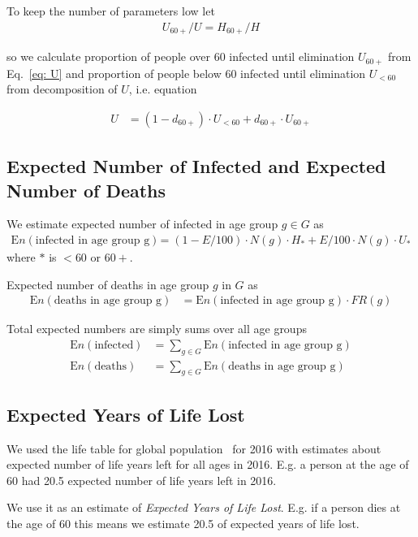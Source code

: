 \documentclass[12pt]{article}
\begin{document}
To keep the number of parameters low let
\begin{align}\label{eq: U}
U_{60+} / U = H_{60+} / H
\end{align}

so we calculate proportion of people over 60 infected until elimination $U_{60+}$ from Eq.~\ref{eq: U} and proportion of people below 60 infected until elimination $U_{<60}$ from decomposition of $U$, i.e. equation

\begin{align*}
U &= (1 - d_{60+}) \cdot U_{<60} + d_{60+} \cdot U_{60+}
\end{align*}

\subsection*{Expected Number of Infected and Expected Number of Deaths}
We estimate expected number of infected in age group $g \in G$ as
\begin{align*}
  \text{E} n(\text{infected in age group g})  &=
    (1 - E/100) \cdot N(g) \cdot H_{\text{*}} + E/100 \cdot N(g) \cdot U_{\text{*}}
\end{align*}
where $\text{*}$ is $<60$ or $60+$.

Expected number of deaths in age group $g$ in $G$ as
\begin{align*}
  \text{E} n(\text{deaths in age group g})  &=
    \text{E} n(\text{infected in age group g})  \cdot FR(g)
\end{align*}

Total expected numbers are simply sums over all age groups
\begin{align*}
  \text{E} n(\text{infected})  &= \sum_{g \in G} \text{E} n(\text{infected in age group g})  \\
  \text{E} n(\text{deaths})  &= \sum_{g \in G} \text{E} n(\text{deaths in age group g}) 
\end{align*}

\subsection*{Expected Years of Life Lost}
We used the life table for global population~\cite{expectancies} for 2016 with estimates about expected number of life years left for all ages in 2016. E.g. a person at the age of 60 had 20.5 expected number of life years left in 2016.

We use it as an estimate of {\it Expected Years of Life Lost}. E.g. if a person dies at the age of 60 this means we estimate 20.5 of expected years of life lost.
\end{document}
